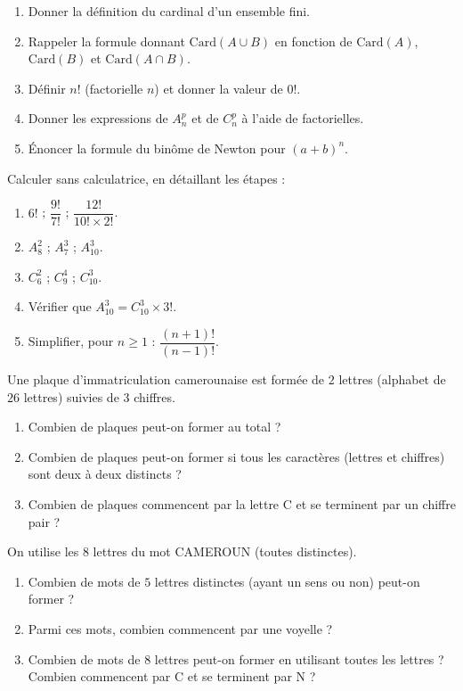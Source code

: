 \documentclass[11pt]{article}
\newcommand{\cle}[1]{{\popxbold\color{popdark}#1}}
\newcounter{popsec}
\newcounter{popsub}
\newcommand{\courssub}[1]{%
  \stepcounter{popsub}%
  \par\vspace{9pt}\noindent{\popxbold\fontsize{11.5}{13}\selectfont\color{popink}{\color{poporange}\thepopsec.\thepopsub}\hspace{6pt}#1}\par\nopagebreak\vspace{4pt}
}
\begin{document}
\begin{exercice}
\begin{enumerate}
\item Donner la définition du \cle{cardinal} d'un ensemble fini.
\item Rappeler la formule donnant $\mathrm{Card}(A \cup B)$ en fonction de $\mathrm{Card}(A)$, $\mathrm{Card}(B)$ et $\mathrm{Card}(A \cap B)$.
\item Définir $n!$ (factorielle $n$) et donner la valeur de $0!$.
\item Donner les expressions de $A_n^p$ et de $C_n^p$ à l'aide de factorielles.
\item Énoncer la \cle{formule du binôme de Newton} pour $(a+b)^n$.
\end{enumerate}
\end{exercice}

\begin{exercice}
Calculer sans calculatrice, en détaillant les étapes :
\begin{enumerate}
\item $6!$ ; $\dfrac{9!}{7!}$ ; $\dfrac{12!}{10! \times 2!}$.
\item $A_8^2$ ; $A_7^3$ ; $A_{10}^3$.
\item $C_6^2$ ; $C_9^4$ ; $C_{10}^3$.
\item Vérifier que $A_{10}^3 = C_{10}^3 \times 3!$.
\item Simplifier, pour $n \ge 1$ : $\dfrac{(n+1)!}{(n-1)!}$.
\end{enumerate}
\end{exercice}

\courssub{Je m'entraîne}

\begin{exercice}
Une plaque d'immatriculation camerounaise est formée de $2$ lettres (alphabet de $26$ lettres) suivies de $3$ chiffres.
\begin{enumerate}
\item Combien de plaques peut-on former au total ?
\item Combien de plaques peut-on former si tous les caractères (lettres et chiffres) sont deux à deux distincts ?
\item Combien de plaques commencent par la lettre C et se terminent par un chiffre pair ?
\end{enumerate}
\end{exercice}

\begin{exercice}
On utilise les $8$ lettres du mot CAMEROUN (toutes distinctes).
\begin{enumerate}
\item Combien de mots de $5$ lettres distinctes (ayant un sens ou non) peut-on former ?
\item Parmi ces mots, combien commencent par une voyelle ?
\item Combien de mots de $8$ lettres peut-on former en utilisant toutes les lettres ? Combien commencent par C et se terminent par N ?
\end{enumerate}
\end{exercice}
\end{document}
